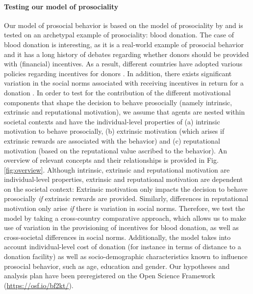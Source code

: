 \documentclass[AER]{AEA}
\begin{document}
\paragraph{Testing our model of prosociality}

Our model of prosocial behavior is based on the model of prosociality by \cite{benabou_incentives_2006} and is tested on an archetypal example of prosociality: blood donation. The case of blood donation is interesting, as it is a real-world example of prosocial behavior and it has a long history of debates regarding whether donors should be provided with (financial) incentives. As a result, different countries have adopted various policies regarding incentives for donors \citep{chell_systematic_2018, healy_embedded_2000}. In addition, there exists significant variation in the social norms associated with receiving incentives in return for a donation \citep{costa-font_not_2013}. In order to test for the contribution of the different motivational components that shape the decision to behave prosocially (namely intrinsic, extrinsic and reputational motivation), we assume that agents are nested within societal contexts and have the individual-level properties of (a) intrinsic motivation to behave prosocially, (b) extrinsic motivation (which arises if extrinsic rewards are associated with the behavior) and (c) reputational motivation (based on the reputational value ascribed to the behavior). An overview of relevant concepts and their relationships is provided in Fig. \ref{fig:overview}. Although intrinsic, extrinsic and reputational motivation are individual-level properties, extrinsic and reputational motivation are dependent on the societal context: Extrinsic motivation only impacts the decision to behave prosocially \textit{if} extrinsic rewards are provided. Similarly, differences in reputational motivation only arise \textit{if} there is variation in social norms. Therefore, we test the model by taking a cross-country comparative approach, which allows us to make use of variation in the provisioning of incentives for blood donation, as well as cross-societal differences in social norms. Additionally, the model takes into account individual-level cost of donation (for instance in terms of distance to a donation facility) as well as socio-demographic characteristics known to influence prosocial behavior, such as age, education and gender. Our hypotheses and analysis plan have been preregistered on the Open Science Framework (\url{https://osf.io/bf2kt/}).
 
\end{document}

